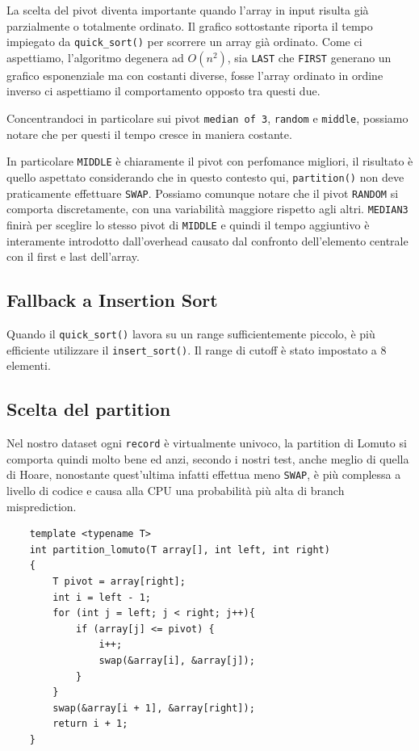 \documentclass[letterpaper]{report}
\begin{document}
La scelta del pivot diventa importante quando l'array in input risulta già
parzialmente o totalmente ordinato.
Il grafico sottostante riporta il tempo impiegato da \verb|quick_sort()| 
per scorrere un array già ordinato. Come ci aspettiamo, l'algoritmo degenera ad
$O(n^2)$, sia \verb|LAST| che \verb|FIRST| generano un grafico esponenziale ma con
costanti diverse, fosse l'array ordinato in ordine inverso ci aspettiamo il comportamento
opposto tra questi due.
\begin{figure}[H]
\centering
    
\end{figure}
Concentrandoci in particolare sui pivot \verb|median of 3|, \verb|random| e \verb|middle|, 
possiamo notare che per questi il tempo cresce in maniera costante.  
\begin{figure}[H]
\centering
    
\end{figure}
In particolare \verb|MIDDLE| è chiaramente il pivot con perfomance migliori, 
il risultato è quello aspettato considerando che in questo contesto qui, 
\verb|partition()| non deve praticamente effettuare \verb|SWAP|. 
Possiamo comunque notare che il pivot \verb|RANDOM| si comporta discretamente, 
con una variabilità maggiore rispetto agli altri. \verb|MEDIAN3|
finirà per sceglire lo stesso pivot di \verb|MIDDLE| e quindi il tempo aggiuntivo
è interamente introdotto dall'overhead causato dal confronto dell'elemento centrale
con il first e last dell'array.

\subsection{Fallback a Insertion Sort}
Quando il \verb|quick_sort()| lavora su un range sufficientemente piccolo, è più
efficiente utilizzare il \verb|insert_sort()|. Il range di cutoff è stato impostato a 8 elementi.

\newpage
\subsection{Scelta del partition}
Nel nostro dataset ogni \verb|record| è virtualmente univoco, la partition di Lomuto
si comporta quindi molto bene ed anzi, secondo i nostri test, anche meglio di quella
di Hoare, nonostante quest'ultima infatti effettua meno \verb|SWAP|, è più complessa a
livello di codice e causa alla CPU una probabilità più alta di branch misprediction.

\begin{lstlisting}
    template <typename T>
    int partition_lomuto(T array[], int left, int right)
    {
        T pivot = array[right];
        int i = left - 1;
        for (int j = left; j < right; j++){
            if (array[j] <= pivot) {
                i++;
                swap(&array[i], &array[j]);
            }
        }
        swap(&array[i + 1], &array[right]);
        return i + 1;
    }
\end{lstlisting}
\end{document}
